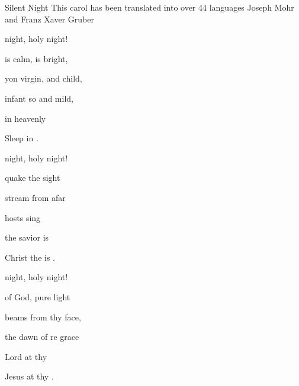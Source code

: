 \begin{SBSong}{Silent Night}
    {This carol has been translated into over 44 languages}
    {Joseph Mohr and Franz Xaver Gruber}
  \begin{SBVerse}
	 night, holy night!

	 is  calm,  is  bright,

	 yon virgin,  and child,

	 infant so  and mild,

	 in  heavenly  

	 Sleep in  . 
  \end{SBVerse}
  \begin{SBVerse}
	 night, holy night!

	 quake  the  sight

	 stream from  afar

	 hosts sing 

	 the savior is  

	Christ the  is . 
  \end{SBVerse}
  
  \begin{SBVerse}
	 night, holy night!

	 of  God,  pure  light

	 beams from thy  face,

	 the dawn of re grace

	  Lord at thy  

	Jesus  at thy .
  \end{SBVerse}
\end{SBSong}

